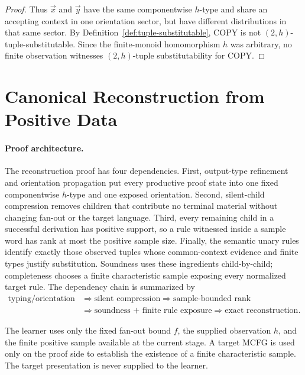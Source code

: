\documentclass[11pt,a4paper]{article}
\numberwithin{equation}{section}
\theoremstyle{plain}
\theoremstyle{definition}
\theoremstyle{remark}
\newcommand{\tuple}[1]{\vec{#1}}
\begin{document}
\begin{proof}
Thus \(\tuple x\) and \(\tuple y\) have the same componentwise \(h\)-type
and share an accepting context in one orientation sector, but have different
distributions in that same sector.
By Definition~\ref{def:tuple-substitutable}, \(\mathrm{COPY}\) is not
\((2,h)\)-tuple-substitutable.  Since the finite-monoid homomorphism \(h\)
was arbitrary, no finite observation witnesses \((2,h)\)-tuple
substitutability for \(\mathrm{COPY}\).
\end{proof}

\section{Canonical Reconstruction from Positive Data}
\label{sec:learner}

\paragraph{Proof architecture.}
The reconstruction proof has four dependencies.  First, output-type refinement
and orientation propagation put every productive proof state into one fixed
componentwise \(h\)-type and one exposed orientation.  Second, silent-child
compression removes children that contribute no terminal material without
changing fan-out or the target language.  Third, every remaining child in a
successful derivation has positive support, so a rule witnessed inside a sample
word has rank at most the positive sample size.  Finally, the semantic unary
rules identify exactly those observed tuples whose common-context evidence and
finite types justify substitution.  Soundness uses these ingredients
child-by-child; completeness chooses a finite characteristic sample exposing
every normalized target rule.  The dependency chain is summarized by
\[
\begin{aligned}
  \text{typing/orientation}
  &\Longrightarrow \text{silent compression}
  \Longrightarrow \text{sample-bounded rank}\\
  &\Longrightarrow \text{soundness + finite rule exposure}
  \Longrightarrow \text{exact reconstruction}.
\end{aligned}
\]


The learner uses only the fixed fan-out bound \(f\), the supplied observation
\(h\), and the finite positive sample available at the current stage.  A target
MCFG is used only on the proof side to establish the existence of a finite
characteristic sample.  The target presentation is never supplied to the
learner.
\end{document}

